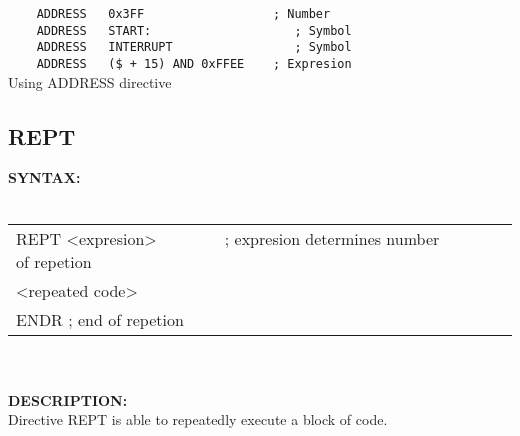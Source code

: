                         \begin{code}[h!]
                                \verb'    '{\color{highlight_directive}\verb'ADDRESS'}\verb'   '{\color{highlight_constant}\verb'0x3FF'}\verb'                  '{\color{highlight_comment}\verb'; Number'}\\
                                \verb'    '{\color{highlight_directive}\verb'ADDRESS'}\verb'   '{\color{highlight_label}\verb'START:'}\verb'                    '{\color{highlight_comment}\verb'; Symbol'}\\
                                \verb'    '{\color{highlight_directive}\verb'ADDRESS'}\verb'   '{\color{highlight_label}\verb'INTERRUPT'}\verb'                 '{\color{highlight_comment}\verb'; Symbol'}\\
                                \verb'    '{\color{highlight_directive}\verb'ADDRESS'}\verb'   '{\color{highlight_constant}\verb'($ + 15) AND 0xFFEE'}\verb'    '{\color{highlight_comment}\verb'; Expresion'}\\
                        \caption{Using ADDRESS directive}
                        \end{code}

                \subsection{REPT}
                \textbf{SYNTAX:}\\
                \\ {
                        \texttt{}
                        \begin{tabular}[h!]{llll}
                                { \color{highlight_directive} REPT }
                                { \color{highlight_constant} <expresion> }\verb'       ' { \color{highlight_comment} ; expresion determines number of repetion  }\\
                                { \color{highlight_symbol} <repeated code> }\\
                                { \color{highlight_directive} ENDR } { \color{highlight_comment} ; end of repetion  }
                        \end{tabular}
                    }\\
                    \\
                \textbf{DESCRIPTION:}\\
                Directive REPT is able to repeatedly execute a block of code.

